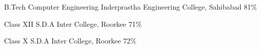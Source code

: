     {B.Tech}
    {Computer Engineering}
    {Inderprastha Engineering College, Sahibabad}
    {81\%}
    {}

    {Class XII}
    {}
    {S.D.A Inter College, Roorkee}
    {71\%}
    {}

    {Class X}
    {}
    {S.D.A Inter College, Roorkee}
    {72\%}
    {}
